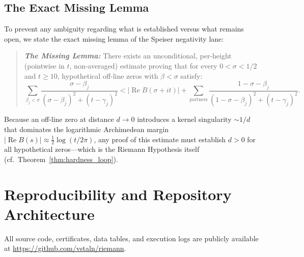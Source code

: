 \documentclass[11pt,a4paper]{article}
\theoremstyle{remark}
\newcommand{\Ree}{\operatorname{Re}}
\begin{document}
\subsection{The Exact Missing Lemma}
To prevent any ambiguity regarding what is established versus what remains open, we state the exact missing lemma of the Speiser negativity lane:
\begin{quote}
\emph{\textbf{The Missing Lemma:}} There exists an unconditional, per-height (pointwise in $t$, non-averaged) estimate proving that for every $0 < \sigma < 1/2$ and $t \ge 10$, hypothetical off-line zeros with $\beta < \sigma$ satisfy:
\begin{equation}
 \sum_{\beta_j < \sigma} \frac{\sigma - \beta_j}{(\sigma - \beta_j)^2 + (t - \gamma_j)^2} < |\Ree B(\sigma + it)| + \sum_{\text{partners}} \frac{1 - \sigma - \beta_j}{(1 - \sigma - \beta_j)^2 + (t - \gamma_j)^2}.
\end{equation}
\end{quote}
Because an off-line zero at distance $d \to 0$ introduces a kernel singularity $\sim 1/d$ that dominates the logarithmic Archimedean margin $|\Ree B(s)| \approx \frac{1}{2}\log(t/2\pi)$, any proof of this estimate must establish $d > 0$ for all hypothetical zeros---which is the Riemann Hypothesis itself (cf.\ Theorem~\ref{thm:hardness_loop}).

\section{Reproducibility and Repository Architecture}

All source code, certificates, data tables, and execution logs are publicly available at \url{https://github.com/vstaln/riemann}.
\end{document}
